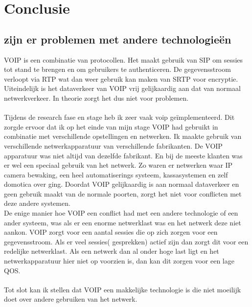 \documentclass[pdftex,a4paper,12pt,twoside]{report}
\begin{document}
\chapter{Conclusie}
\label{ch:conclusie}

\section{zijn er problemen met andere technologieën}
VOIP is een combinatie van protocollen. Het maakt gebruik van SIP om sessies tot stand te brengen en om gebruikers te authenticeren. De gegevensstroom verloopt via RTP wat dan weer gebruik kan maken van SRTP voor encryptie. Uiteindelijk is het dataverkeer van VOIP vrij gelijkaardig aan dat van normaal netwerkverkeer. In theorie zorgt het dus niet voor problemen.
\\ \\
Tijdens de research fase en stage heb ik zeer vaak voip geïmplementeerd. Dit zorgde ervoor dat ik op het einde van mijn stage VOIP had gebruikt in combinatie met verschillende opstellingen en netwerken. Ik maakte gebruik van verschillende netwerkapparatuur van verschillende fabrikanten. De VOIP apparatuur was niet altijd van dezelfde fabrikant. En bij de meeste klanten was er wel een speciaal gebruik van het netwerk. Zo waren er netwerken waar IP camera bewaking, een heel automatiserings systeem, kassasystemen en zelf domotica over ging. Doordat VOIP gelijkaardig is aan normaal dataverkeer en geen gebruik maakt van de normale poorten, zorgt het niet voor conflicten met deze andere systemen.\\
De enige manier hoe VOIP een conflict had met een andere technologie of een ander systeem, was als er een enorme netwerklast was en het netwerk deze niet aankon. VOIP zorgt voor een aantal sessies die op zich zorgen voor een gegevensstroom. Als er veel sessies( gesprekken) actief zijn dan zorgt dit voor een redelijke netwerklast. Als een netwerk dan al onder hoge last ligt en het netwerkapparatuur hier niet op voorzien is, dan kan dit zorgen voor een lage QOS. 
\\ \\
Tot slot kan ik stellen dat VOIP een makkelijke technologie is die niet moeilijk doet over andere gebruiken van het netwerk.
\end{document}
